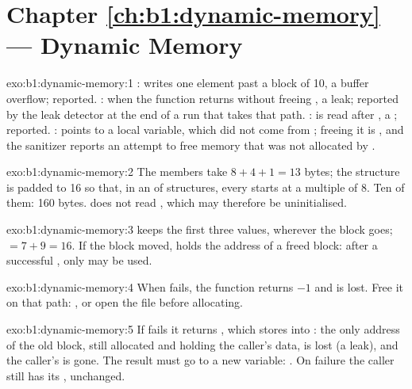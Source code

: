 \section*{Chapter \ref{ch:b1:dynamic-memory} --- Dynamic Memory}

\begin{solution}{exo:b1:dynamic-memory:1}
:  writes one element past a block of 10, a  buffer overflow; reported. : when
 the function returns without freeing , a leak; reported by the leak detector at the end of a run
that takes that path. :  is read after , a ; reported. :
 points to a local variable, which did not come from ; freeing it is , and the
sanitizer reports an attempt to free memory that was not allocated by .
\end{solution}

\begin{solution}{exo:b1:dynamic-memory:2}
The members take $8 + 4 + 1 = 13$ bytes; the structure is padded to 16 so that, in an  of structures, every
 starts at a multiple of 8. Ten of them: 160 bytes.  does not read , which may
therefore be uninitialised.
\end{solution}

\begin{solution}{exo:b1:dynamic-memory:3}
 keeps the first three values, wherever the block goes;  $= 7 + 9 = 16$. If the block moved,
 holds the address of a freed block: after a successful , only  may be used.
\end{solution}

\begin{solution}{exo:b1:dynamic-memory:4}
When  fails, the function returns $-1$ and  is lost. Free it on that path:
, or open the file before allocating.
\end{solution}

\begin{solution}{exo:b1:dynamic-memory:5}
If  fails it returns , which  stores into : the only address of the old
block, still allocated and holding the caller's data, is lost (a leak), and the caller's  is gone. The result must
go to a new variable:
.
On failure the caller still has its , unchanged.
\end{solution}

